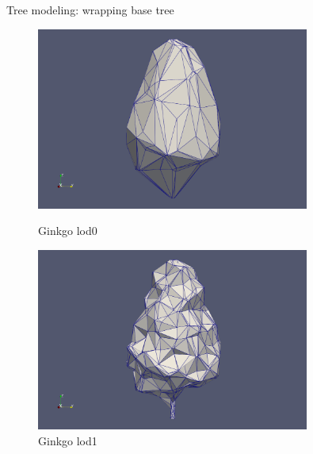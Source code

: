 \documentclass[10pt]{beamer}
\begin{document}
\begin{frame}{Tree modeling: wrapping base tree}
  \Large
  \begin{figure}[H]
    \centering
    \begin{minipage}{0.49\textwidth}
        \centering
        \includegraphics[width=0.8\textwidth]{images/gingko_lod0.png}
        \caption{Ginkgo lod0}
    \end{minipage}\hfill
    \begin{minipage}{0.49\textwidth}
        \centering
        \includegraphics[width=0.8\textwidth]{images/gingko_lod1.png}
        \caption{Ginkgo lod1}
    \end{minipage}
\end{figure}


\end{frame}
\end{document}
